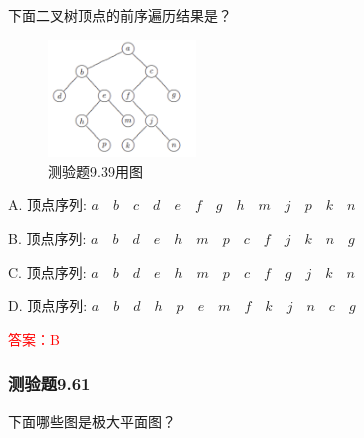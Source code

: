 \documentclass[UTF8, heading=true]{ctexart}
\begin{document}
下面二叉树顶点的前序遍历结果是？

\begin{figure}[htbp]
  \centering
  \includegraphics[width=0.35\textwidth]{9.39.png} %
  \caption{测验题9.39用图}
\end{figure}

A. 顶点序列: $a \quad b \quad c \quad d \quad e \quad f \quad g \quad h \quad m \quad j \quad p \quad k \quad n$

B. 顶点序列: $a \quad b \quad d \quad e \quad h \quad m \quad p \quad c \quad f \quad j \quad k \quad n \quad g$

C. 顶点序列: $a \quad b \quad d \quad e \quad h \quad m \quad p \quad c \quad f \quad g \quad j \quad k \quad n$

D. 顶点序列: $a \quad b \quad d \quad h \quad p \quad e \quad m \quad f \quad k \quad j \quad n \quad c \quad g$

\textcolor{red}{答案：B}

\subsubsection{测验题9.61}

下面哪些图是极大平面图？
\end{document}
